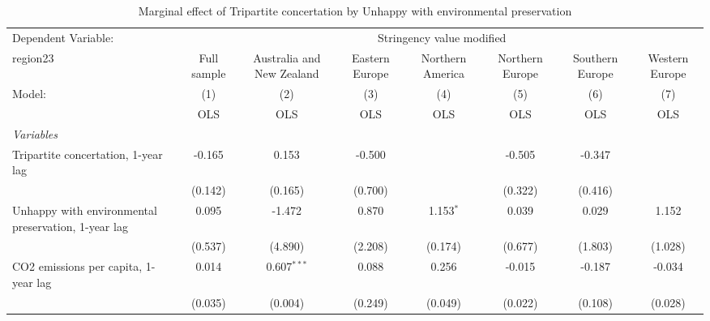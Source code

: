 
\begin{table}[htbp]
   \caption{Marginal effect of Tripartite concertation by Unhappy with environmental preservation}
   \centering
   \begin{tabular}{lccccccc}
      \toprule
      Dependent Variable: & \multicolumn{7}{c}{Stringency value modified}\\
      region23                                                                                  & Full sample   & Australia and New Zealand & Eastern Europe & Northern America & Northern Europe & Southern Europe & Western Europe \\   
      Model:                                                                                    & (1)           & (2)                       & (3)            & (4)              & (5)             & (6)             & (7)\\  
                                                                                                &  OLS          & OLS                       & OLS            & OLS              & OLS             & OLS             & OLS\\  
      \midrule
      \emph{Variables}\\
      Tripartite concertation, 1-year lag                                                       & -0.165        & 0.153                     & -0.500         &                  & -0.505          & -0.347          &   \\   
                                                                                                & (0.142)       & (0.165)                   & (0.700)        &                  & (0.322)         & (0.416)         &   \\   
      Unhappy with environmental preservation, 1-year lag                                       & 0.095         & -1.472                    & 0.870          & 1.153$^{*}$      & 0.039           & 0.029           & 1.152\\   
                                                                                                & (0.537)       & (4.890)                   & (2.208)        & (0.174)          & (0.677)         & (1.803)         & (1.028)\\   
      CO2 emissions per capita, 1-year lag                                                      & 0.014         & 0.607$^{***}$             & 0.088          & 0.256            & -0.015          & -0.187          & -0.034\\   
                                                                                                & (0.035)       & (0.004)                   & (0.249)        & (0.049)          & (0.022)         & (0.108)         & (0.028)\\   

\end{tabular}
\end{table}
